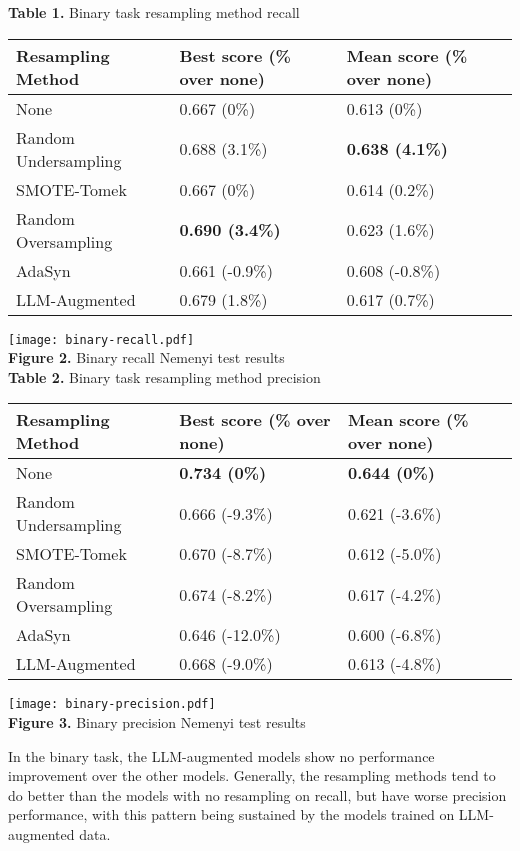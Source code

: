 \documentclass[runningheads]{llncs}
\newenvironment{nscenter}
 {\parskip=0pt\par\nopagebreak\centering}
 {\par\noindent\ignorespacesafterend}
\begin{document}
\begin{nscenter}
{\bf Table 1.} Binary task resampling method recall\\

\begin{tabular}{|l|l|l|}
\hline
Resampling Method & Best score (\% over none) & Mean score (\% over none) \\\hline
None & 0.667 (0\%) & 0.613 (0\%) \\\hline
Random Undersampling & 0.688 (3.1\%) & {\bf 0.638 (4.1\%)} \\\hline
SMOTE-Tomek & 0.667 (0\%) & 0.614 (0.2\%) \\\hline
Random Oversampling & {\bf 0.690 (3.4\%)} & 0.623 (1.6\%) \\\hline
AdaSyn & 0.661 (-0.9\%) & 0.608 (-0.8\%) \\\hline
LLM-Augmented & 0.679 (1.8\%) & 0.617 (0.7\%) \\\hline
\end{tabular}

\texttt{[image: binary-recall.pdf]}\\
{\bf Figure 2.} Binary recall Nemenyi test results\\
\vspace{\baselineskip}
{\bf Table 2.} Binary task resampling method precision\\

\begin{tabular}{|l|l|l|}
\hline
Resampling Method & Best score (\% over none) & Mean score (\% over none) \\\hline
None & {\bf 0.734 (0\%)} & {\bf 0.644 (0\%)} \\\hline
Random Undersampling & 0.666 (-9.3\%) & 0.621 (-3.6\%) \\\hline
SMOTE-Tomek & 0.670 (-8.7\%) & 0.612 (-5.0\%) \\\hline
Random Oversampling & 0.674 (-8.2\%) & 0.617 (-4.2\%) \\\hline
AdaSyn & 0.646 (-12.0\%) & 0.600 (-6.8\%) \\\hline
LLM-Augmented & 0.668 (-9.0\%) & 0.613 (-4.8\%) \\\hline
\end{tabular}

\texttt{[image: binary-precision.pdf]}\\
{\bf Figure 3.} Binary precision Nemenyi test results
\end{nscenter}
In the binary task, the LLM-augmented models show no performance improvement over the other models. Generally, the resampling methods tend to do better than the models with no resampling on recall, but have worse precision performance, with this pattern being sustained by the models trained on LLM-augmented data.
\end{document}
